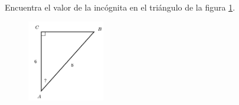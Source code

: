 \question[15]  Encuentra el valor de la incógnita en el triángulo de la figura \ref{fig:angle_functrig_16}.
\begin{figure}[H]
    \begin{center}
        \includegraphics[width=0.3\textwidth]{../images/angle_functrig_16.png}
    \end{center}
    \caption{}
    \label{fig:angle_functrig_16}
\end{figure}